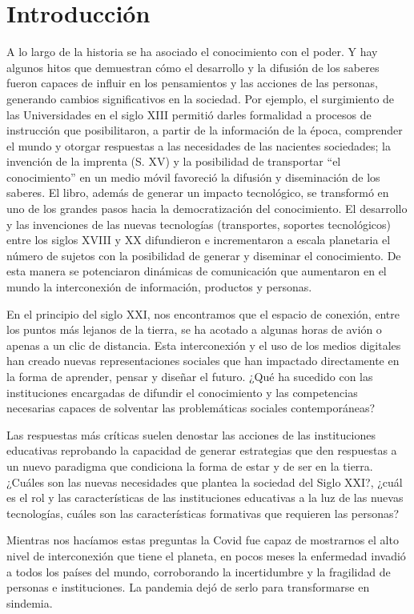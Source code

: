 \documentclass{textolivre}
\begin{document}
\section{Introducción}\label{sec-intro}
A lo largo de la historia se ha asociado el conocimiento con el poder. Y hay algunos hitos que demuestran cómo el desarrollo y la difusión de los saberes fueron capaces de influir en los pensamientos y las acciones de las personas, generando cambios significativos en la sociedad. Por ejemplo, el surgimiento de las Universidades en el siglo XIII permitió darles formalidad a procesos de instrucción que posibilitaron, a partir de la información de la época, comprender el mundo y otorgar respuestas a las necesidades de las nacientes sociedades; la invención de la imprenta (S. XV) y la posibilidad de transportar “el conocimiento” en un medio móvil favoreció la difusión y diseminación de los saberes. El libro, además de generar un impacto tecnológico, se transformó en uno de los grandes pasos hacia la democratización del conocimiento. El desarrollo y las invenciones de las nuevas tecnologías (transportes, soportes tecnológicos) entre los siglos XVIII y XX difundieron e incrementaron a escala planetaria el número de sujetos con la posibilidad de generar y diseminar el conocimiento. De esta manera se potenciaron dinámicas de comunicación que aumentaron en el mundo la interconexión de información, productos y personas.

En el principio del siglo XXI, nos encontramos que el espacio de conexión, entre los puntos más lejanos de la tierra, se ha acotado a algunas horas de avión o apenas a un clic de distancia. Esta interconexión y el uso de los medios digitales han creado nuevas representaciones sociales que han impactado directamente en la forma de aprender, pensar y diseñar el futuro. ¿Qué ha sucedido con las instituciones encargadas de difundir el conocimiento y las competencias necesarias capaces de solventar las problemáticas sociales contemporáneas?

Las respuestas más críticas suelen denostar las acciones de las instituciones educativas reprobando la capacidad de generar estrategias que den respuestas a un nuevo paradigma que condiciona la forma de estar y de ser en la tierra. ¿Cuáles son las nuevas necesidades que plantea la sociedad del Siglo XXI?, ¿cuál es el rol y las características de las instituciones educativas a la luz de las nuevas tecnologías, cuáles son las características formativas que requieren las personas?

Mientras nos hacíamos estas preguntas la Covid fue capaz de mostrarnos el alto nivel de interconexión que tiene el planeta, en pocos meses la enfermedad invadió a todos los países del mundo, corroborando la incertidumbre y la fragilidad de personas e instituciones. La pandemia dejó de serlo para transformarse en sindemia.
\end{document}
